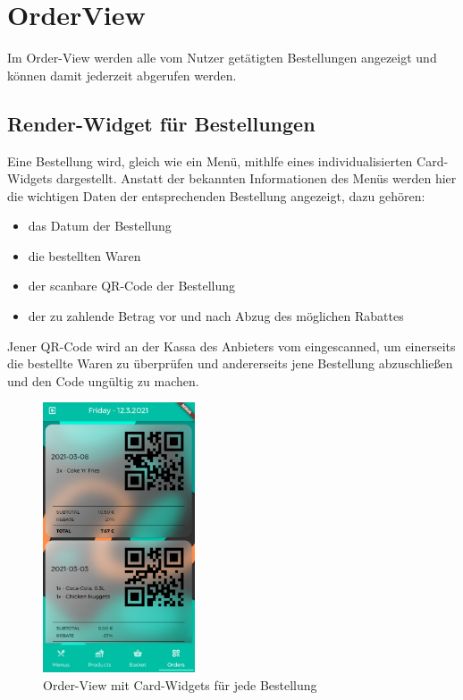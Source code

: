 \section{OrderView}

Im Order-View werden alle vom Nutzer getätigten Bestellungen angezeigt und können damit
jederzeit abgerufen werden.

\subsection{Render-Widget für Bestellungen}

Eine Bestellung wird, gleich wie ein Menü, mithlfe eines individualisierten Card-Widgets
dargestellt.
Anstatt der bekannten Informationen des Menüs werden hier die wichtigen Daten der entsprechenden
Bestellung angezeigt, dazu gehören:

\begin{itemize}
    \item das Datum der Bestellung
    \item die bestellten Waren
    \item der scanbare QR-Code der Bestellung
    \item der zu zahlende Betrag vor und nach Abzug des möglichen Rabattes
\end{itemize}

Jener QR-Code wird an der Kassa des Anbieters vom  eingescanned, um einerseits
die bestellte Waren zu überprüfen und andererseits jene Bestellung abzuschließen und den Code
ungültig zu machen.

\begin{figure}[H]
    \centering
    \includegraphics[width=0.40\textwidth]{images/Client/views/orderview/orderview.png}
    \caption{Order-View mit Card-Widgets für jede Bestellung}
\end{figure}
